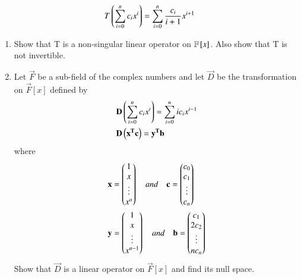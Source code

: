 \begin{enumerate}[label=\thesubsection.\arabic*.,ref=\thesubsection.\theenumi]
\begin{align}
T\left(\sum \limits_{i=0}^n c_i x^i\right)=\sum \limits_{i=0}^n \frac{c_i}{i+1} x^{i+1}\label{q}
\end{align}
\begin{enumerate}
\item  Show that T is a non-singular linear operator on $\mathbb{F}{}\left[x\right]$. Also show that T is not invertible.
\\
\solution

\item Let $\vec{F}$ be a sub-field of the complex numbers and let $\vec{D}$ be the transformation on $\vec{F}[x]$ defined by
\begin{align}
& \mathbf{D}\left(\sum_{i=0}^{n}c_ix^{i}\right) = \sum_{i=0}^{n}ic_ix^{i-1} \label{eq:solutions/4/1/9/b/1} \\
& \mathbf{D}\left(\mathbf{x^Tc}\right) = \mathbf{y^{T}b}
\end{align}
where
\begin{align}
& \mathbf{x} = \begin{pmatrix}1 \\ x \\ \vdots \\ x^n\end{pmatrix} \quad and \quad \mathbf{c} =\begin{pmatrix}c_0 \\ c_1 \\ \vdots \\ c_n\end{pmatrix} \\
& \mathbf{y} = \begin{pmatrix}1 \\ x \\ \vdots \\ x^{n-1}\end{pmatrix} \quad and \quad  \mathbf{b} = \begin{pmatrix}c_1 \\ 2c_2 \\ \vdots \\ nc_n\end{pmatrix}
\end{align}
Show that $\vec{D}$ is a linear operator on $\vec{F}[x]$ and find its null space.
%
\\
\solution

\end{enumerate}
\end{enumerate}

